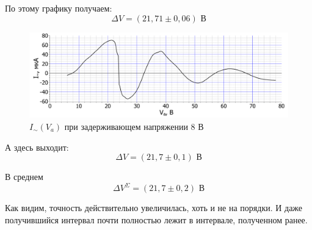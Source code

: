 По этому графику получаем:
\begin{equation*}
	\Delta V = (21,71 \pm 0,06) \text{ В}
\end{equation*}


\begin{figure}[h!]
	\centering
	\includegraphics[width=\linewidth]{./Pictures/I_tilde(V)_8V.pdf}
	\caption{$I_\sim (V_a)$ при задерживающем напряжении 8 В}
\end{figure}

А здесь выходит:
\begin{equation*}
	\Delta V = (21,7 \pm 0,1) \text{ В}
\end{equation*}

В среднем
\begin{equation*}
	\boxed{\Delta V^\Sigma = (21,7 \pm 0,2) \text{ В}}
\end{equation*}

Как видим, точность действительно увеличилась, хоть и не на порядки. И даже получившийся интервал почти полностью лежит в интервале, полученном ранее.


